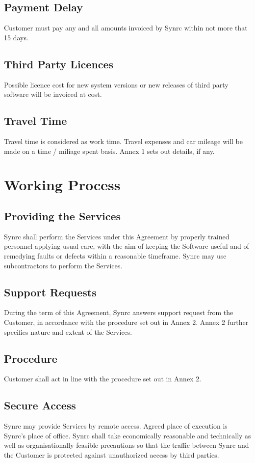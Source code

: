 \documentclass[11pt,oneside]{article}
\begin{document}
\subsection{Payment Delay}
Customer must pay any and all amounts invoiced by Synrc within not
more that 15 days.
\subsection{Third Party Licences}
Possible licence cost for new system versions or new releases of
third party software will be invoiced at cost.
\subsection{Travel Time}
Travel time is considered as work time. Travel expenses and car mileage
will be made on a time / miliage spent basis. Annex 1 sets out details, if any.

\section{Working Process}
\subsection{Providing the Services}
Synrc shall perform the Services under this Agreement by properly trained personnel
applying usual care, with the aim of keeping the Software useful and of remedying
faults or defects within a reasonable timeframe. Synrc may use subcontractors
to perform the Services.
\subsection{Support Requests}
During the term of this Agreement, Synrc answers support request from the Customer,
in accordance with the procedure set out in Annex 2. Annex 2 further specifies
nature and extent of the Services.
\subsection{Procedure}
Customer shall act in line with the procedure set out in Annex 2.
\subsection{Secure Access}
Synrc may provide Services by remote access. Agreed place of execution is Synrc's place
of office. Synrc shall take economically reasonable and technically as well as
organisationally feasible precautions so that the traffic between Synrc and
the Customer is protected against unauthorized access by third parties.
\end{document}
